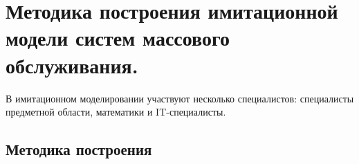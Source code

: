 \section{Методика построения имитационной модели систем массового обслуживания.}

В имитационном моделировании участвуют несколько специалистов: специалисты предметной области, математики и IT-специалисты.

\subsection*{Методика построения}

